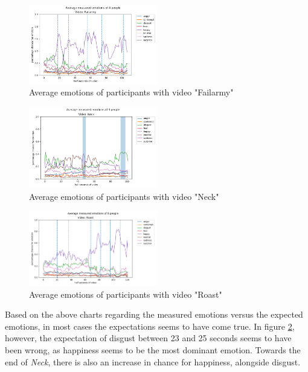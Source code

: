 \documentclass[sigconf]{acmart}
\begin{document}
\begin{figure}[H]
    \centering
    \includegraphics[width=0.5\textwidth, scale=1]{chart_failarmy_small.png}
    \caption{Average emotions of participants with video "Failarmy"}
    \label{chart_failarmy}
\end{figure}

\begin{figure}[H]
    \centering
    \includegraphics[width=0.5\textwidth, scale=1]{chart_neck_small.png}
    \caption{Average emotions of participants with video "Neck"}
    \label{chart_neck}
\end{figure}

\begin{figure}[H]
    \centering
    \includegraphics[width=0.5\textwidth, scale=1]{chart_roast_small.png}
    \caption{Average emotions of participants with video "Roast"}
    \label{chart_roast}
\end{figure}

Based on the above charts regarding the measured emotions versus the expected emotions, in most cases the
expectations seems to have come true. In figure \ref{chart_neck}, however, the expectation of disgust between
23 and 25 seconds seems to have been wrong, as happiness seems to be the most dominant emotion. Towards the end
of \emph{Neck}, there is also an increase in chance for happiness, alongside disgust.
\end{document}

